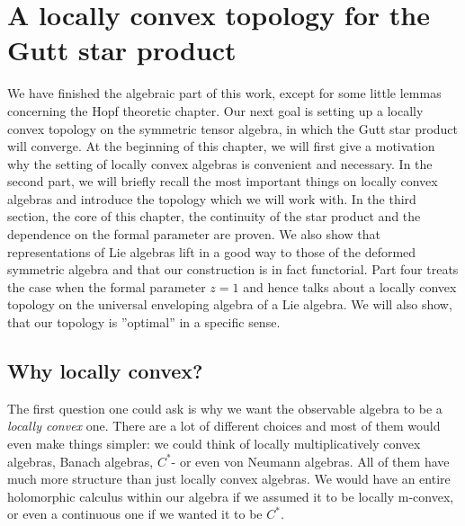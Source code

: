 
%
%

\chapter{A locally convex topology for the Gutt star product}

We have finished the algebraic part of this work, except for some little 
lemmas concerning the Hopf theoretic chapter. Our next goal is setting up a 
locally convex topology on the symmetric tensor algebra, in which the Gutt 
star product will converge. At the beginning of this chapter, we will 
first give a motivation why the setting of locally convex algebras is 
convenient and necessary. In the second part, we will briefly recall the most 
important things on locally convex algebras and introduce the topology which 
we will work with. In the third section, the core of this chapter, the 
continuity of the star product and the dependence on the formal parameter are 
proven. We also show that representations of Lie algebras lift in a good way to  those of the deformed symmetric algebra and that our construction is in fact functorial. Part four treats the case when the formal parameter $z = 1$ and hence talks about a locally convex topology on the universal enveloping algebra of a Lie algebra. We will also show, that our topology is ''optimal'' in a specific sense.



\section{Why locally convex?}
\label{sec:chap5_Prelim}

The first question one could ask is why we want the observable algebra 
to be a \textit{locally convex} one. There are a lot of different choices 
and most of them would even make things simpler: we could think of 
locally multiplicatively convex algebras, Banach algebras, $C^*$- or even 
von Neumann algebras. All of them have much more structure than just 
locally convex algebras. We would have an entire holomorphic calculus 
within our algebra if we assumed it to be locally m-convex, or even a 
continuous one if we wanted it to be $C^*$.


